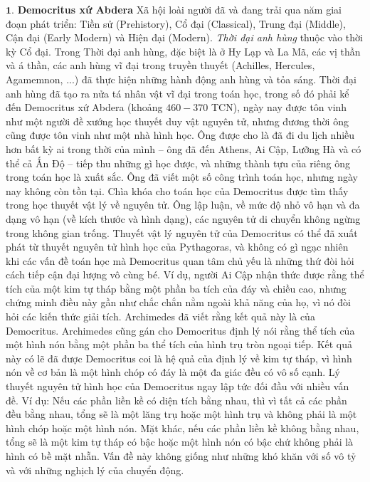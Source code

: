\begin{multicols}{2}
	$\pmb{1}$. \textbf{\color{lichsutoanhoc}Democritus xứ Abdera} 
	\vskip 0.1cm
	Xã hội loài người đã và đang trải qua năm giai đoạn phát triển: Tiền sử (Prehistory), Cổ đại (Classical), Trung đại (Middle), Cận đại (Early Modern) và Hiện đại (Modern). \textit{Thời đại anh hùng} thuộc vào thời kỳ Cổ đại. Trong Thời đại anh hùng, đặc biệt là ở Hy Lạp và La Mã, các vị thần và á thần, các anh hùng vĩ đại trong truyền thuyết (Achilles, Hercules, Agamemnon, ...)  đã thực hiện những hành động anh hùng và tỏa sáng. 
	\vskip 0.1cm
	Thời đại anh hùng đã tạo ra nửa tá nhân vật vĩ đại trong toán học, trong số đó phải kể đến Democritus xứ Abdera (khoảng $460-370$ TCN), ngày nay được tôn vinh như một người đề xướng học thuyết duy vật nguyên tử, nhưng đương thời ông cũng được tôn vinh như một nhà hình học. Ông được cho là đã đi du lịch nhiều hơn bất kỳ ai trong thời của mình -- ông đã đến Athens, Ai Cập, Lưỡng Hà và có thể cả Ấn Độ -- tiếp thu những gì học được, và những thành tựu của riêng ông trong toán học là xuất sắc. Ông đã viết một số công trình toán học, nhưng ngày nay không còn tồn tại. 
	\vskip 0.1cm
	Chìa khóa cho toán học của Democritus được tìm thấy trong học thuyết vật lý về nguyên tử. Ông lập luận, về mức độ nhỏ vô hạn và đa dạng vô hạn (về kích thước và hình dạng), các nguyên tử di chuyển không ngừng trong không gian trống.
	\vskip 0.1cm 
	Thuyết vật lý nguyên tử của Democritus có thể đã xuất phát từ thuyết nguyên tử hình học của Pythagoras, và không có gì ngạc nhiên khi các vấn đề toán học mà Democritus quan tâm chủ yếu là những thứ đòi hỏi cách tiếp cận đại lượng vô cùng bé. Ví dụ, người Ai Cập nhận thức được rằng thể tích của một kim tự tháp bằng một phần ba tích của đáy và chiều cao, nhưng chứng minh điều này gần như chắc chắn nằm ngoài khả năng của họ, vì nó đòi hỏi các kiến thức giải tích.  Archimedes đã viết rằng kết quả này là của Democritus.  Archimedes cũng gán cho Democritus định lý nói  rằng thể tích của một hình nón bằng một phần ba thể tích của hình trụ tròn ngoại tiếp. Kết quả này có lẽ đã được Democritus coi là hệ quả của định lý về kim tự tháp, vì hình nón về cơ bản là một hình chóp có đáy là một đa giác đều có vô số cạnh.
	\vskip 0.1cm
	Lý thuyết nguyên tử hình học của Democritus ngay lập tức đối đầu với nhiều vấn đề. Ví dụ: Nếu các phần liền kề có diện tích bằng nhau, thì vì tất cả các phần đều bằng nhau, tổng sẽ là một lăng trụ hoặc một hình trụ và không phải là một hình chóp hoặc một hình nón. 
	\vskip 0.1cm
	Mặt khác, nếu các phần liền kề không bằng nhau, tổng sẽ là một kim tự tháp có bậc hoặc một hình nón có bậc chứ không phải là hình có bề mặt nhẵn. Vấn đề này không giống như những khó khăn với số vô tỷ và với những nghịch lý của chuyển động.

\end{multicols}

